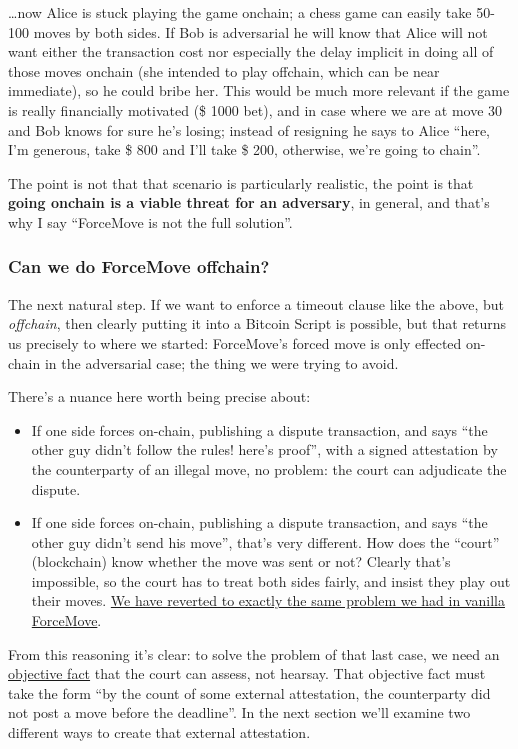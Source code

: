 \documentclass[11pt]{article}
\begin{document}
\ldots now Alice is stuck playing the game onchain; a chess game can easily take 50-100 moves by both sides. If Bob is adversarial he will know that Alice will not want either the transaction cost nor especially the delay implicit in doing all of those moves onchain (she intended to play offchain, which can be near immediate), so he could bribe her. This would be much more relevant if the game is really financially motivated (\$ 1000 bet), and in case where we are at move 30 and Bob knows for sure he's losing; instead of resigning he says to Alice ``here, I'm generous, take \$ 800 and I'll take \$ 200, otherwise, we're going to chain''.

The point is not that that scenario is particularly realistic, the point is that \textbf{going onchain is a viable threat for an adversary}, in general, and that's why I say ``ForceMove is not the full solution''.

\subsubsection{Can we do ForceMove offchain?}

The next natural step. If we want to enforce a timeout clause like the above, but \emph{offchain}, then clearly putting it into a Bitcoin Script is possible, but that returns us precisely to where we started: ForceMove's forced move is only effected on-chain in the adversarial case; the thing we were trying to avoid.

There's a nuance here worth being precise about:

\begin{itemize}

\item If one side forces on-chain, publishing a dispute transaction, and says ``the other guy didn't follow the rules! here's proof'', with a signed attestation by the counterparty of an illegal move, no problem: the court can adjudicate the dispute.
\item If one side forces on-chain, publishing a dispute transaction, and says ``the other guy didn't send his move'', that's very different. How does the ``court'' (blockchain) know whether the move was sent or not? Clearly that's impossible, so the court has to treat both sides fairly, and insist they play out their moves. \uline{We have reverted to exactly the same problem we had in vanilla ForceMove}.
\end{itemize}

From this reasoning it's clear: to solve the problem of that last case, we need an \uline{objective fact} that the court can assess, not hearsay. That objective fact must take the form ``by the count of some external attestation, the counterparty did not post a move before the deadline''. In the next section we'll examine two different ways to create that external attestation.
\end{document}
